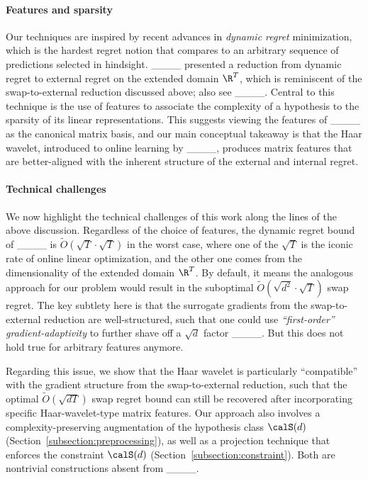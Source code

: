 \paragraph{Features and sparsity} Our techniques are inspired by recent advances in \emph{dynamic regret} minimization, which is the hardest regret notion that compares to an arbitrary sequence of predictions selected in hindsight. ____ presented a reduction from dynamic regret to external regret on the extended domain $\R^T$, which is reminiscent of the swap-to-external reduction discussed above; also see ____. Central to this technique is the use of features to associate the complexity of a hypothesis to the sparsity of its linear representations. This suggests viewing the features of ____ as the canonical matrix basis, and our main conceptual takeaway is that the Haar wavelet, introduced to online learning by ____, produces matrix features that are better-aligned with the inherent structure of the external and internal regret. 

\paragraph{Technical challenges} We now highlight the technical challenges of this work along the lines of the above discussion. Regardless of the choice of features, the dynamic regret bound of ____ is $\tilde O(\sqrt{T}\cdot\sqrt{T})$ in the worst case, where one of the $\sqrt{T}$ is the iconic rate of online linear optimization, and the other one comes from the dimensionality of the extended domain $\R^T$. By default, it means the analogous approach for our problem would result in the suboptimal $\tilde O(\sqrt{d^2}\cdot\sqrt{T})$ swap regret. The key subtlety here is that the surrogate gradients from the swap-to-external reduction are well-structured, such that one could use \emph{``first-order'' gradient-adaptivity} to further shave off a $\sqrt{d}$ factor ____. But this does not hold true for arbitrary features anymore. 

Regarding this issue, we show that the Haar wavelet is particularly ``compatible'' with the gradient structure from the swap-to-external reduction, such that the optimal $\tilde O(\sqrt{dT})$ swap regret bound can still be recovered after incorporating specific Haar-wavelet-type matrix features. Our approach also involves a complexity-preserving augmentation of the hypothesis class $\calS(d)$ (Section~\ref{subsection:preprocessing}), as well as a projection technique that enforces the constraint $\calS(d)$ (Section~\ref{subsection:constraint}). Both are nontrivial constructions absent from ____.